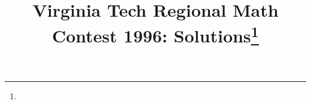 \documentclass[10pt]{article}
\begin{document}
\title{Virginia Tech Regional Math Contest 1996: Solutions\footnote{\disclaimer}}
\author{\vspace{-2ex}}
\date{\vspace{-5ex}} %
\maketitle

%

%

%

%

%

%

%
\end{document}
